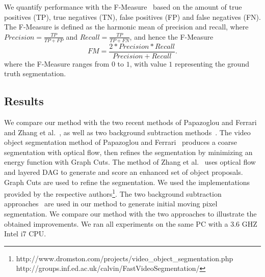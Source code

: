 
We quantify performance with the F-Measure~\cite{sobral2014} based on the amount of true positives (TP), true negatives (TN), false positives (FP) and false negatives (FN). The F-Measure is defined as the harmonic mean of precision and recall, where $Precision = \frac{TP}{TP+FP}$ and $Recall = \frac{TP}{TP+FN}$, and hence the F-Measure
\begin{equation}
\label{equ-fm}
FM = \frac{2*Precision*Recall}{Precision+Recall}.
\end{equation}
where the F-Measure ranges from $0$ to $1$, with value $1$ representing the ground truth segmentation.


\subsection{Results}
\label{sec:vos:e:r}

We compare our method with the two recent methods of Papazoglou and Ferrari~\cite{papazoglou2013} and Zhang et al.~\cite{zhang2013}, as well as two background subtraction methods~\cite{kaewtrakulpong2002,zivkovic2004}.
The video object segmentation method of Papazoglou and Ferrari~\cite{papazoglou2013} produces a coarse segmentation with optical flow, then refines the segmentation by minimizing an energy function with Graph Cuts.
The method of Zhang et al.~\cite{zhang2013} uses optical flow and layered DAG to generate and score an enhanced set of object proposals. Graph Cuts are used to refine the segmentation.
We used the implementations provided by the respective authors\footnote{http://www.dromston.com/projects/video\_object\_segmentation.php\\http://groups.inf.ed.ac.uk/calvin/FastVideoSegmentation/}.
The two background subtraction approaches~\cite{kaewtrakulpong2002,zivkovic2004} are used in our method to generate initial moving pixel segmentation. We compare our method with the two approaches to illustrate the obtained improvements.
We ran all experiments on the same PC with a 3.6 GHZ Intel i7 CPU.

